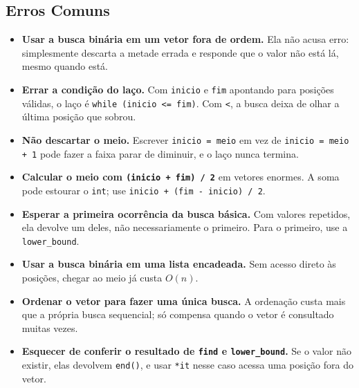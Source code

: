 \subsection{Erros Comuns}

\begin{itemize}
  \item \textbf{Usar a busca binária em um vetor fora de ordem.} Ela não acusa erro: simplesmente descarta a metade errada e responde que o valor não está lá, mesmo quando está.
  \item \textbf{Errar a condição do laço.} Com \texttt{inicio} e \texttt{fim} apontando para posições válidas, o laço é \texttt{while (inicio <= fim)}. Com \texttt{<}, a busca deixa de olhar a última posição que sobrou.
  \item \textbf{Não descartar o meio.} Escrever \texttt{inicio = meio} em vez de \texttt{inicio = meio + 1} pode fazer a faixa parar de diminuir, e o laço nunca termina.
  \item \textbf{Calcular o meio com \texttt{(inicio + fim) / 2}} em vetores enormes. A soma pode estourar o \texttt{int}; use \texttt{inicio + (fim - inicio) / 2}.
  \item \textbf{Esperar a primeira ocorrência da busca básica.} Com valores repetidos, ela devolve um deles, não necessariamente o primeiro. Para o primeiro, use a \texttt{lower\_bound}.
  \item \textbf{Usar a busca binária em uma lista encadeada.} Sem acesso direto às posições, chegar ao meio já custa $O(n)$.
  \item \textbf{Ordenar o vetor para fazer uma única busca.} A ordenação custa mais que a própria busca sequencial; só compensa quando o vetor é consultado muitas vezes.
  \item \textbf{Esquecer de conferir o resultado de \texttt{find} e \texttt{lower\_bound}.} Se o valor não existir, elas devolvem \texttt{end()}, e usar \texttt{*it} nesse caso acessa uma posição fora do vetor.
\end{itemize}
